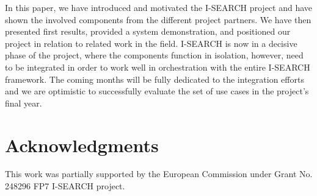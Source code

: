 \documentclass{acm_proc_article-sp}
\newcommand{\inlinelistingsize}{\fontsize{8pt}{11pt}}
\let\oldttdefault\ttdefault
\renewcommand{\ttdefault}{pcr}
\let\oldurl\url
\renewcommand{\url}[1]{\inlinelistingsize\oldurl{#1}}
\begin{document}
In this paper, we have introduced and motivated the \mbox{I-SEARCH} project and have shown the involved components from the different project partners.
We have then presented first results, provided a system demonstration, and positioned our project in relation to related work in the field.
\mbox{I-SEARCH} is now in a decisive phase of the project, where the components function in isolation, however, need to be integrated in order to work well in orchestration with the entire \mbox{I-SEARCH} framework.
The coming months will be fully dedicated to the integration efforts and we are optimistic to successfully evaluate the set of use cases in the project's final year.

\section{Acknowledgments}
This work was partially supported by the European Commission under Grant No. 248296 FP7 \mbox{I-SEARCH} project.

\let\ttdefault\oldttdefault
\let\url\oldurl




\balancecolumns
\end{document}
